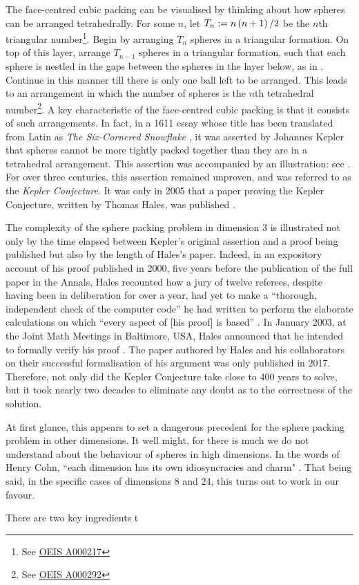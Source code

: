 The face-centred cubic packing can be visualised by thinking about how spheres can be arranged tetrahedrally. For some $n$, let $T_n := n\left( n + 1 \right)/2$ be the $n$th triangular number\footnote{See \href{https://oeis.org/A000217}{OEIS A000217}}. Begin by arranging $T_n$ spheres in a triangular formation. On top of this layer, arrange $T_{n - 1}$ spheres in a triangular formation, such that each sphere is nestled in the gaps between the spheres in the layer below, as in . Continue in this manner till there is only one ball left to be arranged. This leads to an arrangement in which the number of spheres is the $n$th tetrahedral number\footnote{See \href{https://oeis.org/A000292}{OEIS A000292}}. A key characteristic of the face-centred cubic packing is that it consists of such arrangements. In fact, in a 1611 essay whose title has been translated from Latin as \textit{The Six-Cornered Snowflake} \cite{KeplerSnowflake}, it was asserted by Johannes Kepler that spheres cannot be more tightly packed together than they are in a tetrahedral arrangement. This assertion was accompanied by an illustration: see . For over three centuries, this assertion remained unproven, and was referred to as the \textit{Kepler Conjecture}. It was only in 2005 that a paper proving the Kepler Conjecture, written by Thomas Hales, was published \cite{HalesKeplerInformal}.

The complexity of the sphere packing problem in dimension $3$ is illustrated not only by the time elapsed between Kepler's original assertion and a proof being published but also by the length of Hales's paper. Indeed, in an expository account of his proof published in 2000, five years before the publication of the full paper in the Annals, Hales recounted how a jury of twelve referees, despite having been in deliberation for over a year, had yet to make a ``thorough, independent check of the computer code'' he had written to perform the elaborate calculations on which ``every aspect of [his proof] is based'' \cite{CannonHoney}. In January 2003, at the Joint Math Meetings in Baltimore, USA, Hales announced that he intended to formally verify his proof \cite{HalesKeplerFormal}. The paper authored by Hales and his collaborators on their successful formalisation of his argument was only published in 2017. Therefore, not only did the Kepler Conjecture take close to 400 years to solve, but it took nearly two decades to eliminate any doubt as to the correctness of the solution.

At first glance, this appears to set a dangerous precedent for the sphere packing problem in other dimensions. It well might, for there is much we do not understand about the behaviour of spheres in high dimensions. In the words of Henry Cohn, ``each dimension has its own idiosyncracies and charm" \cite{CohnOnViazovskaAMS}. That being said, in the specific cases of dimensions $8$ and $24$, this turns out to work in our favour.

There are two key ingredients t